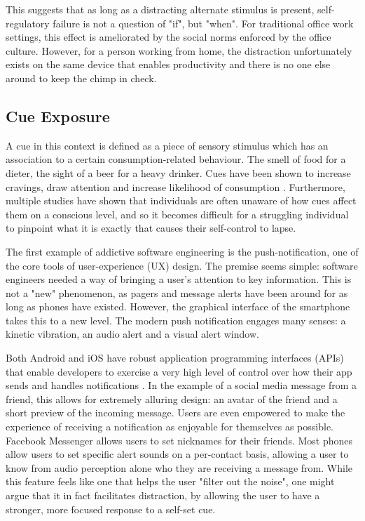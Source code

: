 This suggests that as long as a distracting alternate stimulus is present, self-regulatory failure is not a question of "if", but "when". For traditional office work settings, this effect is ameliorated by the social norms enforced by the office culture. However, for a person working from home, the distraction unfortunately exists on the same device that enables productivity and there is no one else around to keep the chimp in check.

\subsection{Cue Exposure}
A cue in this context is defined as a piece of sensory stimulus which has an association to a certain consumption-related behaviour. The smell of food for a dieter, the sight of a beer for a heavy drinker. Cues have been shown to increase cravings, draw attention and increase likelihood of consumption \cite{jansen1998learning}. Furthermore, multiple studies have shown that individuals are often unaware of how cues affect them on a conscious level\cite{stacy2010implicit}, and so it becomes difficult for a struggling individual to pinpoint what it is exactly that causes their self-control to lapse.

The first example of addictive software engineering is the push-notification, one of the core tools of user-experience (UX) design. The premise seems simple: software engineers needed a way of bringing a user's attention to key information. This is not a "new" phenomenon, as pagers and message alerts have been around for as long as phones have existed. However, the graphical interface of the smartphone takes this to a new level. The modern push notification engages many senses: a kinetic vibration, an audio alert and a visual alert window.

Both Android and iOS have robust application programming interfaces (APIs) that enable developers to exercise a very high level of control over how their app sends and handles notifications \cite{androidnotification}. In the example of a social media message from a friend, this allows for extremely alluring design: an avatar of the friend and a short preview of the incoming message. Users are even empowered to make the experience of receiving a notification as enjoyable for themselves as possible. Facebook Messenger allows users to set nicknames for their friends. Most phones allow users to set specific alert sounds on a per-contact basis, allowing a user to know from audio perception alone who they are receiving a message from. While this feature feels like one that helps the user "filter out the noise", one might argue that it in fact facilitates distraction, by allowing the user to have a stronger, more focused response to a self-set cue.

